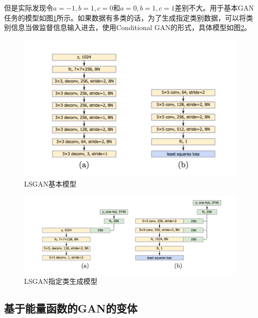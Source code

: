 \documentclass[a4paper]{article}
\begin{document}
但是实际发现令$a=-1,b=1,c=0$和$a=0,b=1,c=1$差别不大。用于基本GAN任务的模型如图\ref{fig:44}所示。如果数据有多类的话，为了生成指定类别数据，可以将类别信息当做监督信息输入进去，使用Conditional GAN的形式，具体模型如图\ref{fig:45}。
\begin{figure}
\centering
\includegraphics[width=\textwidth]{./img/44.png}
\caption{LSGAN基本模型}
\label{fig:44}
\end{figure}
\begin{figure}
\centering
\includegraphics[width=\textwidth]{./img/45.png}
\caption{LSGAN指定类生成模型}
\label{fig:45}
\end{figure}

\subsection{基于能量函数的GAN的变体}
\end{document}
